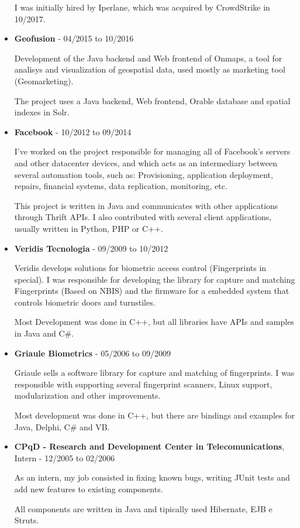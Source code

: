 \documentclass[a4paper,10pt]{article}
\begin{document}
\begin{itemize}
        I was initially hired by Iperlane, which was acquired by CrowdStrike in 10/2017.

      \item
        \textbf{Geofusion} - 04/2015 to 10/2016
        
        Development of the Java backend and Web frontend of Onmaps, a tool for analisys and visualization of geospatial data, used mostly as marketing tool (Geomarketing).
        
        The project uses a Java backend, Web frontend, Orable database and spatial indexes in Solr.

      \item
        \textbf{Facebook} - 10/2012 to 09/2014
        
        I've worked on the project responsible for managing all of Facebook's servers and other datacenter devices, and which acts as an intermediary between several automation tools, such as: Provisioning, application deployment, repairs, financial systems, data replication, monitoring, etc.
        
        This project is written in Java and communicates with other applications through Thrift APIs. I also contributed with several client applications, usually written in Python, PHP or C++.

    
      \item  
        \textbf{Veridis Tecnologia} - 09/2009 to 10/2012

        Veridis develops solutions for biometric access control (Fingerprints in special). I was responsible for developing the library for capture and  matching Fingerprints (Based on NBIS) and the firmware for a embedded system that controls biometric doors and turnstiles.
        
        Most Development was done in C++, but all libraries have APIs and samples in Java and C\#.

      \item  
        \textbf{Griaule Biometrics} - 05/2006 to 09/2009

        Griaule sells a software library for capture and matching of fingerprints. I was responsible with supporting several fingerprint scanners, Linux support, modularization and other improvements.
        
        Most development was done in C++, but there are bindings and examples for Java, Delphi, C\# and VB.

      \item
        \textbf{CPqD - Research and Development Center in Telecomunications}, Intern - 12/2005 to 02/2006

        As an intern, my job consisted in fixing known bugs, writing JUnit tests and add new features to existing components.

        All components are written in Java and tipically used Hibernate, EJB e Struts.
    \end{itemize}
\end{document}
